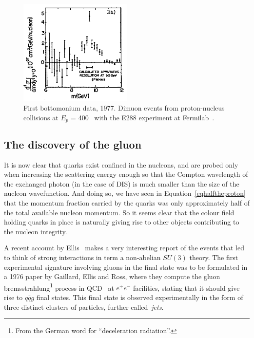 \begin{figure}[h]
\begin{center}
  \includegraphics[width=0.5\textwidth]{Chapters/pQCD/first_ups.png}
 \caption{First bottomonium data, 1977. Dimuon events from proton-nucleus collisions
 at $E_{p}$ = 400 \GeV\ with the E288 experiment at Fermilab~\cite{lederman}.}
 \label{fig:upsi}
\end{center}
\end{figure}

\subsection{The discovery of the gluon}

It is now clear that quarks exist
confined in the nucleons, and are probed only when increasing the
scattering energy enough so that the Compton wavelength of the
exchanged photon (in the case of DIS) is much smaller than the size of
the nucleon wavefunction. And doing so, we have seen in Equation~\ref{eqhalftheproton} that the
momentum fraction carried by the quarks was only
approximately half of the total available nucleon momentum. So it
seems clear that the colour field holding quarks in place is naturally
giving rise to other objects contributing to the nucleon integrity.


A recent account by Ellis~\cite{gluon_ellis} makes a very interesting
report of the events that led to think of strong interactions in term
a non-abelian $SU(3)$ theory. The first experimental signature
involving gluons in the final state was to be formulated in a 1976 paper by
Gaillard, Ellis and Ross, where they compute the gluon
bremsstrahlung\footnote{From the German word for ``deceleration radiation''.}
process in QCD~\cite{qqg} at $e^{+}e^{-}$ facilities, stating that it
should give rise to $q\bar{q}g$ final states. This final state is
observed experimentally in the form of three distinct clusters of
particles, further called~\textit{jets}.

